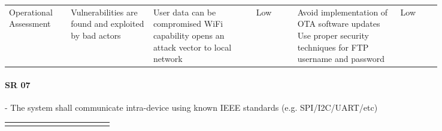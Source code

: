 \begin{landscape}
{\begin{longtable}{| p{0.12\linewidth} | p{0.16\linewidth} |  p{0.20\linewidth} | p{0.08\linewidth} | p{0.20\linewidth} | p{0.08\linewidth} |}
	\hline
	Operational \newline Assessment & Vulnerabilities are found and exploited by bad actors & User data can be compromised \newline WiFi capability opens an attack vector to local network & \cellcolor{green} Low & Avoid implementation of OTA software updates \newline Use proper security techniques for FTP username and password & \cellcolor{green} Low
	\label{tab:sr06_feasibility}
\end{longtable}
}
\newpage



\paragraph*{SR 07} - The system shall communicate intra-device using known IEEE standards (e.g. SPI/I2C/UART/etc) 

{\fontsize{8pt}{8pt}\selectfont
\begin{longtable}{| p{0.12\linewidth} | p{0.16\linewidth} |  p{0.20\linewidth} | p{0.08\linewidth} | p{0.20\linewidth} | p{0.08\linewidth} |}
	\hline \endlastfoot
	

\end{longtable}}
\end{landscape}
